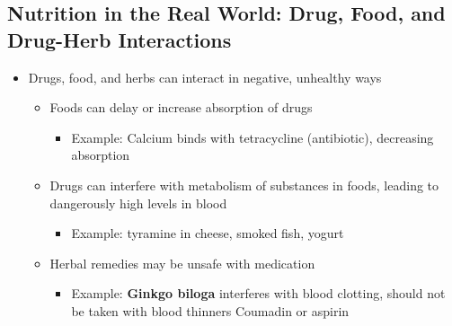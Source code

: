 \documentclass[12pt]{article}
\begin{document}
        \subsection{Nutrition in the Real World: Drug, Food, and Drug-Herb Interactions}
            \begin{itemize}
                \item Drugs, food, and herbs can interact in negative, unhealthy ways
                    \begin{itemize}
                        \item Foods can delay or increase absorption of drugs
                            \begin{itemize}
                                \item Example: Calcium binds with tetracycline (antibiotic), decreasing absorption
                            \end{itemize}
                        \item Drugs can interfere with metabolism of substances in foods, leading to dangerously high levels in blood
                            \begin{itemize}
                                \item Example: tyramine in cheese, smoked fish, yogurt
                            \end{itemize}
                        \item Herbal remedies may be unsafe with medication
                            \begin{itemize}
                                \item Example: \textbf{Ginkgo biloga} interferes with blood clotting, should not be taken with blood thinners Coumadin or aspirin
                            \end{itemize}
                    \end{itemize}
            \end{itemize}
\end{document}
